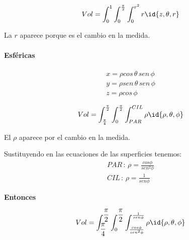 \[Vol = \int_0^1\int_0^{\frac{\pi}{2}} \int_0^{r^2} r \id{z,\theta,r}\]

La $r$ aparece porque es el cambio en la medida.

\paragraph{Esféricas}

\begin{gather*}
x = \rho cos\,\theta\,sen\,\phi\\
y = \rho sen\,\theta\,sen\,\phi\\
z = \rho cos\,\phi
\end{gather*}

\[Vol = \int_{\frac{\pi}{4}}^{\frac{\pi}{2}} \int_0^{\frac{\pi}{2}} \int_{PAR}^{CIL}\rho\id{\rho,\theta,\phi}\]

El $\rho$ aparece por el cambio en la medida.

Sustituyendo en las ecuaciones de las superficies tenemos:
\begin{gather*}
PAR \,: \, \rho = \frac{cos\phi}{sen^2\phi}\\
CIL \,:\, \rho = \frac{1}{sen\phi}
\end{gather*}

\textbf{Entonces}

\[Vol = \int_{\displaystyle\frac{\pi}{4}}^{\displaystyle\frac{\pi}{2}} \int_0^{\displaystyle\frac{\pi}{2}} \int_{\frac{cos\phi}{sen^2\phi}}^{\frac{1}{sen\phi}}\rho\id{\rho,\theta,\phi}\]


